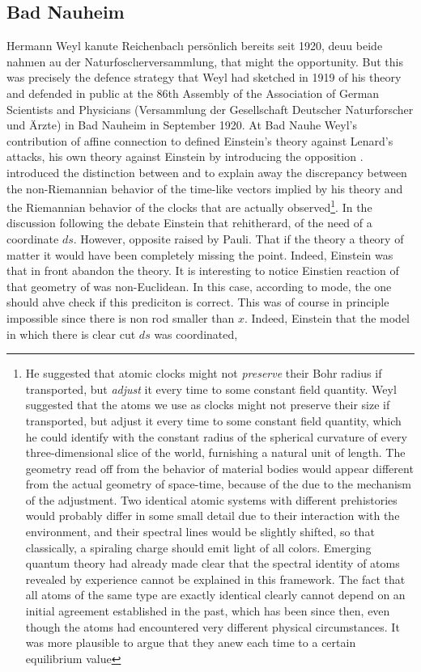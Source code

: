 \documentclass[draft]{article}
\begin{document}
{\subsection{Bad Nauheim}

Hermann Weyl kanute Reichenbaclı persönlich bereits seit 1920, deuu beide nahnıen au der Naturfosclıerversammlung, that might the opportunity. But this was precisely the defence strategy that Weyl had sketched in 1919 of his theory and defended in public  at the 86th Assembly of the Association of German Scientists and Physicians (Versammlung der Gesellschaft Deutscher Naturforscher und Ärzte) in Bad Nauheim in September 1920. At Bad Nauhe Weyl's contribution of   affine connection to defined Einstein's theory against Lenard's attacks, his own theory against Einstein by introducing the opposition . \citet{Weyl1920a} introduced the distinction between  and  to explain away the discrepancy between the non-Riemannian behavior of the  time-like vectors implied by his theory and the Riemannian behavior of the  clocks that are actually observed\footnote{He suggested that atomic clocks might not \emph{preserve} their Bohr radius if transported, but \emph{adjust} it every time to some constant field quantity. Weyl suggested that the atoms we use as clocks might not preserve their size if transported, but adjust it every time to some constant field quantity, which he could identify with the constant radius of the spherical curvature of every three-dimensional slice of the world, furnishing a natural unit of length. The geometry read off from the behavior of material bodies would appear different from the actual geometry of space-time, because of the  due to the mechanism of the adjustment. Two identical  atomic systems with different prehistories would probably differ in some small detail due to their interaction with the environment, and their spectral lines would be slightly shifted, so that classically, a spiraling charge should emit light of all colors. Emerging quantum theory had already made clear that the spectral identity of atoms revealed by experience cannot be explained in this framework. The fact that all atoms of the same type are exactly identical clearly cannot depend on an initial agreement established in the past, which has been  since then, even though the atoms had encountered very different physical circumstances. It was more plausible to argue that they  anew each time to a certain equilibrium value}. In the discussion following the debate Einstein that rehitherard, of the need of a coordinate $ds$. However, opposite raised by Pauli. That if the theory a theory of matter it would have been completely missing the point. Indeed, Einstein was that in front abandon the theory. It is interesting to notice Einstien reaction of that geometry of \spti was non-Euclidean. In this case, according to mode, the one should ahve check if this prediciton is correct. This was of course in principle impossible since there is non rod smaller than $x$. Indeed, Einstein that the model in which there is clear cut $ds$ was coordinated, }
\end{document}
